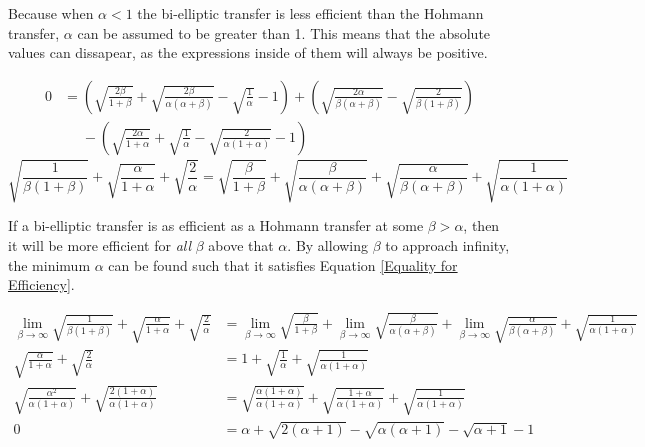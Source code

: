 \documentclass[../main.tex]{subfiles}
\begin{document}
Because when $\alpha<1$ the bi-elliptic transfer is less efficient than the Hohmann transfer, $\alpha$ can be assumed to be greater than 1. This means that the absolute values can dissapear, as the expressions inside of them will always be positive.

\begin{align*}
    0 & =\left(\sqrt{\frac{2\beta}{1+\beta}}+\sqrt{\frac{2\beta}{\alpha(\alpha+\beta)}}-\sqrt{\frac{1}{\alpha}}-1\right)+\left(\sqrt{\frac{2\alpha}{\beta(\alpha+\beta)}}-\sqrt{\frac{2}{\beta(1+\beta)}}\right) \\
      & \phantom{=}-\left(\sqrt{\frac{2\alpha}{1+\alpha}}+\sqrt{\frac{1}{\alpha}}-\sqrt{\frac{2}{\alpha(1+\alpha)}}-1\right)
\end{align*}
\begin{equation}\label{Equality for Efficiency}
    \sqrt{\frac{1}{\beta(1+\beta)}}+\sqrt{\frac{\alpha}{1+\alpha}}+\sqrt{\frac{2}{\alpha}}=\sqrt{\frac{\beta}{1+\beta}}+\sqrt{\frac{\beta}{\alpha(\alpha+\beta)}}+\sqrt{\frac{\alpha}{\beta(\alpha+\beta)}}+\sqrt{\frac{1}{\alpha(1+\alpha)}}
\end{equation}

If a bi-elliptic transfer is as efficient as a Hohmann transfer at some $\beta>\alpha$, then it will be more efficient for \textit{all} $\beta$ above that $\alpha$. By allowing $\beta$ to approach infinity, the minimum $\alpha$ can be found such that it satisfies Equation \eqref{Equality for Efficiency}.

\begin{align*}
    \lim_{\beta\rightarrow\infty}\sqrt{\frac{1}{\beta(1+\beta)}}+\sqrt{\frac{\alpha}{1+\alpha}}+\sqrt{\frac{2}{\alpha}} & =\lim_{\beta\rightarrow\infty}\sqrt{\frac{\beta}{1+\beta}}+\lim_{\beta\rightarrow\infty}\sqrt{\frac{\beta}{\alpha(\alpha+\beta)}}+\lim_{\beta\rightarrow\infty}\sqrt{\frac{\alpha}{\beta(\alpha+\beta)}}+\sqrt{\frac{1}{\alpha(1+\alpha)}} \\
    \sqrt{\frac{\alpha}{1+\alpha}}+\sqrt{\frac{2}{\alpha}}                                                              & =1+\sqrt{\frac{1}{\alpha}}+\sqrt{\frac{1}{\alpha(1+\alpha)}}                                                                                                                                                                               \\
    \sqrt{\frac{\alpha^2}{\alpha(1+\alpha)}}+\sqrt{\frac{2(1+\alpha)}{\alpha(1+\alpha)}}                                & =\sqrt{\frac{\alpha(1+\alpha)}{\alpha(1+\alpha)}}+\sqrt{\frac{1+\alpha}{\alpha(1+\alpha)}}+\sqrt{\frac{1}{\alpha(1+\alpha)}}                                                                                                               \\
    0                                                                                                                   & =\alpha+\sqrt{2(\alpha+1)}-\sqrt{\alpha(\alpha+1)}-\sqrt{\alpha+1}-1
\end{align*}
\end{document}
